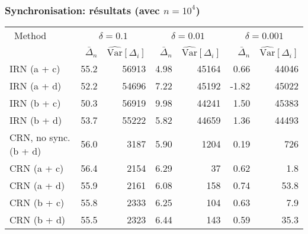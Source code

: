 \documentclass[t,usepdftitle=false]{beamer}
\def\Var{\mbox{Var}}
\begin{document}
\begin{frame}
\frametitle{Synchronisation: résultats (avec ${n=10^4}$)}

\begin{footnotesize}
\begin{center}
\begin{tabular}{|l|rr|rr|rr|}
\hline
  \ Method
 & \multicolumn{2}{|c}{$\delta = 0.1$}
 & \multicolumn{2}{|c}{$\delta = 0.01$}
 & \multicolumn{2}{|c|}{$\delta = 0.001$} \\
 & $\bar \Delta_n$ & $\widehat{\Var}[\Delta_i]$
 & $\bar \Delta_n$ & $\widehat{\Var}[\Delta_i]$
 & $\bar \Delta_n$ & $\widehat{\Var}[\Delta_i]$\\
\hline
IRN (a + c)                      &  55.2 & 56913 &  4.98 & 45164 &  0.66 & 44046 \\
IRN (a + d)                      &  52.2 & 54696 &  7.22 & 45192 & -1.82 & 45022 \\
IRN (b + c)                      &  50.3 & 56919 &  9.98 & 44241 &  1.50 & 45383 \\
IRN (b + d)                      &  53.7 & 55222 &  5.82 & 44659 &  1.36 & 44493 \\
CRN, no sync. (b + d)            &  56.0 &  3187 &  5.90 &  1204 &  0.19 &   726 \\
CRN (a + c)                      &  56.4 &  2154 &  6.29 &    37 &  0.62 &   1.8 \\
CRN (a + d)                      &  55.9 &  2161 &  6.08 &   158 &  0.74 &  53.8 \\
CRN (b + c)                      &  55.8 &  2333 &  6.25 &   104 &  0.63 &   7.9 \\
CRN (b + d)                      &  55.5 &  2323 &  6.44 &   143 &  0.59 &  35.3 \\
\hline
\end{tabular}
\end{center}
\end{footnotesize}

\end{frame}
\end{document}

